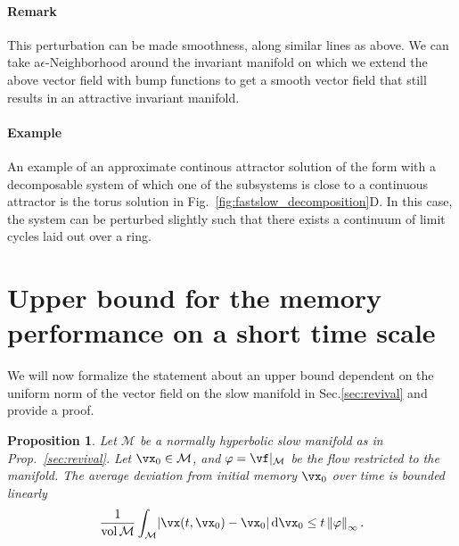 \documentclass{article} %
\newcounter{ct}
\newcommand{\dm}[1]{\ensuremath{\mathrm{d}{#1}}} %
\newcommand{\manifold}{\mathcal{M}}
\newcommand{\uniformNorm}[1]{\left\|#1\right\|_\infty} %
\DeclarePairedDelimiter{\abs}{\lvert}{\rvert}
\newtheorem{prop}{Proposition}
\theoremstyle{definition}
\theoremstyle{remark}
\begin{document}
\paragraph{Remark}
This perturbation can be made smoothness, along similar lines as above.
We can take a\(\epsilon\)-Neighborhood around the invariant manifold on which we extend the above vector field with bump functions to get a smooth vector field that still results in an attractive invariant manifold.


\paragraph{Example}
An example of an approximate continous attractor solution of the form with a decomposable system of which one of the subsystems is close to a continuous attractor is the torus solution in Fig.~\ref{fig:fastslow_decomposition}D.
In this case, the system can be perturbed slightly such that there exists a continuum of limit cycles laid out over a ring.




%











\newpage
\section{Upper bound for the memory performance on a short time scale}\label{sec:supp:ub}
We will now formalize the statement about an upper bound dependent on the uniform norm of the vector field on the slow manifold in Sec.\ref{sec:revival} and provide a proof.
\begin{prop}\label{prop:ub}
Let \(\manifold\) be a normally hyperbolic slow manifold as in Prop.~\ref{sec:revival}.
Let \(\vx_0 \in \manifold\), and \(\varphi = \vf\vert_\manifold\) be the flow restricted to the manifold.
The average deviation from initial memory \(\vx_0\) over time is bounded linearly
\begin{align}
\frac{1}{\operatorname{vol}\manifold}\int_\manifold
\abs{\vx(t, \vx_0) - \vx_0}\,
\dm{\vx_0}
\leq t\uniformNorm{\varphi}.
\end{align}
\end{prop}
\end{document}
